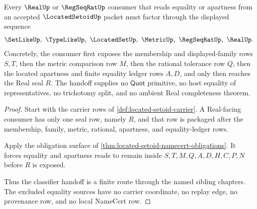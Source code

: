 \begin{theorem}
\label{thm:located-setoid-real-classifier-handoff}
Every $\RealUp$ or $\RegSeqRatUp$ consumer that reads equality or apartness from an accepted $\LocatedSetoidUp$ packet must factor through the displayed sequence
$$
\SetLikeUp,\ \TypeLikeUp,\ \LocatedSetUp,\ \MetricUp,\ \RegSeqRatUp,\ \RealUp .
$$
Concretely, the consumer first exposes the membership and displayed-family rows $S,T$, then the metric comparison row $M$, then the rational tolerance row $Q$, then the located apartness and finite equality ledger rows $A,D$, and only then reaches the Real seal $R$. The handoff supplies no $\mathsf{Quot}$ primitive, no host equality of representatives, no trichotomy split, and no ambient Real completeness theorem.
\end{theorem}
\begin{proof}
Start with the carrier rows of \autoref{def:located-setoid-carrier}. A Real-facing consumer has only one seal row, namely $R$, and that row is packaged after the membership, family, metric, rational, apartness, and equality-ledger rows.

Apply the obligation surface of \autoref{thm:located-setoid-namecert-obligations}. It forces equality and apartness reads to remain inside $S,T,M,Q,A,D,H,C,P,N$ before $R$ is exposed.

Thus the classifier handoff is a finite route through the named sibling chapters. The excluded equality sources have no carrier coordinate, no replay edge, no provenance row, and no local NameCert row.
\end{proof}


\begin{closurestatus}{\LocatedSetoidUp}
  \theoryclosure{\seedClosure}
  \formalstatus{\unformalizedV}
\end{closurestatus}
